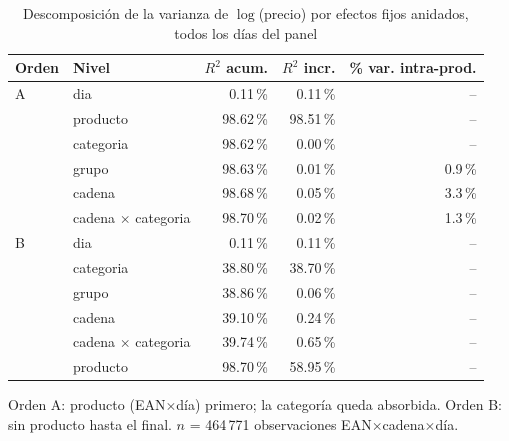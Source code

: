 \begin{table}[htbp]
\caption{Descomposici\'on de la varianza de $\log$(precio) por efectos fijos anidados, todos los d\'ias del panel}
\label{tab:varianza}
\centering\scriptsize\setlength{\tabcolsep}{3pt}
\begin{tabular}{@{}llrrr@{}}
\toprule
Orden & Nivel & $R^2$ acum. & $R^2$ incr. & \% var. intra-prod. \\
\midrule
A & dia & 0.11\,\% & 0.11\,\% & -- \\
 & producto & 98.62\,\% & 98.51\,\% & -- \\
 & categoria & 98.62\,\% & 0.00\,\% & -- \\
 & grupo & 98.63\,\% & 0.01\,\% & 0.9\,\% \\
 & cadena & 98.68\,\% & 0.05\,\% & 3.3\,\% \\
 & cadena $\times$ categoria & 98.70\,\% & 0.02\,\% & 1.3\,\% \\
\midrule
B & dia & 0.11\,\% & 0.11\,\% & -- \\
 & categoria & 38.80\,\% & 38.70\,\% & -- \\
 & grupo & 38.86\,\% & 0.06\,\% & -- \\
 & cadena & 39.10\,\% & 0.24\,\% & -- \\
 & cadena $\times$ categoria & 39.74\,\% & 0.65\,\% & -- \\
 & producto & 98.70\,\% & 58.95\,\% & -- \\
\bottomrule\end{tabular}
\par\smallskip\raggedright\scriptsize Orden A: producto (EAN$\times$d\'ia) primero; la categor\'ia queda absorbida. Orden B: sin producto hasta el final. $n$ = 464\,771 observaciones EAN$\times$cadena$\times$d\'ia.
\end{table}
